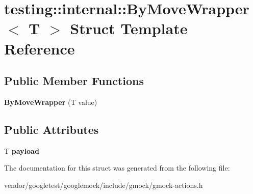\hypertarget{structtesting_1_1internal_1_1_by_move_wrapper}{}\section{testing\+:\+:internal\+:\+:By\+Move\+Wrapper$<$ T $>$ Struct Template Reference}
\label{structtesting_1_1internal_1_1_by_move_wrapper}
\subsection*{Public Member Functions}
\begin{DoxyCompactItemize}
\item 
\mbox{\label{structtesting_1_1internal_1_1_by_move_wrapper_a60df33395785e0bfc5f72fba32376349}} 
{\bfseries By\+Move\+Wrapper} (T value)
\end{DoxyCompactItemize}
\subsection*{Public Attributes}
\begin{DoxyCompactItemize}
\item 
\mbox{\label{structtesting_1_1internal_1_1_by_move_wrapper_ae8407b1ae99db3f00797d68b9ee9e870}} 
T {\bfseries payload}
\end{DoxyCompactItemize}


The documentation for this struct was generated from the following file\+:\begin{DoxyCompactItemize}
\item 
vendor/googletest/googlemock/include/gmock/gmock-\/actions.\+h\end{DoxyCompactItemize}
